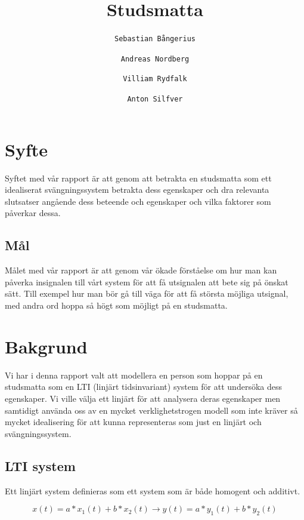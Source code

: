 \documentclass[10pt,a4paper]{article}
\author{
  \texttt{Sebastian Bångerius}
  \and
  \texttt{Andreas Nordberg}
  \and
  \texttt{Villiam Rydfalk}
  \and
  \texttt{Anton Silfver}
}
\begin{document}

\title{Studsmatta}
\maketitle

\cleardoublepage

\tableofcontents

\clearpage

\section{Syfte}
\setcounter{page}{3}

Syftet med vår rapport är att genom att betrakta en studsmatta som ett idealiserat svängningssystem betrakta dess egenskaper och dra relevanta slutsatser angående dess beteende och egenskaper och vilka faktorer som påverkar dessa.

\subsection{Mål}

Målet med vår rapport är att genom vår ökade förståelse om hur man kan påverka insignalen till vårt system för att få utsignalen att bete sig på önskat sätt. Till exempel hur man bör gå till väga för att få största möjliga utsignal, med andra ord hoppa så högt som möjligt på en studsmatta.

\section{Bakgrund}

Vi har i denna rapport valt att modellera en person som hoppar på en studsmatta som en LTI (linjärt tidsinvariant) system för att undersöka dess egenskaper. Vi ville välja ett linjärt för att analysera deras egenskaper men samtidigt använda oss av en mycket verklighetstrogen modell som inte kräver så mycket idealisering för att kunna representeras som just en linjärt och svängningssystem.

\subsection{LTI system}

Ett linjärt system definieras som ett system som är både homogent och additivt.

\begin{equation}
x(t) = a*x_1(t) + b*x_2(t)\rightarrow y(t) = a*y_1(t) + b*y_2(t)
\end{equation}
\end{document}
